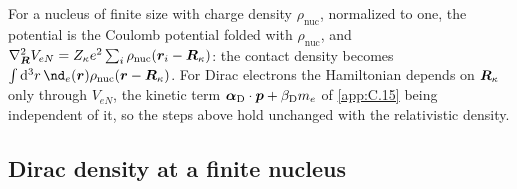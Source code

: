 For a nucleus of finite size with charge density $\rho_{\mathrm{nuc}}$, normalized to one, the potential is the Coulomb potential folded with $\rho_{\mathrm{nuc}}$, and $\nabla^2_{\bm{R}}V_{eN} = Z_\kappa e^2\sum_i\rho_{\mathrm{nuc}}(\bm{r}_i - \bm{R}_\kappa)$: the contact density becomes $\int\dd^3r\,\nd_e(\vect{r})\rho_{\mathrm{nuc}}(\vect{r} - \vect{R}_\kappa)$. For Dirac electrons the Hamiltonian depends on $\bm{R}_\kappa$ only through $V_{eN}$, the kinetic term $\boldsymbol{\alpha}_{\mathrm{D}}\cdot\bm{p} + \beta_{\mathrm{D}}m_e$ of \cref{app:C.15} being independent of it, so the steps above hold unchanged with the relativistic density.

\subsection{Dirac density at a finite nucleus}\label{app:D.34-dirac}

